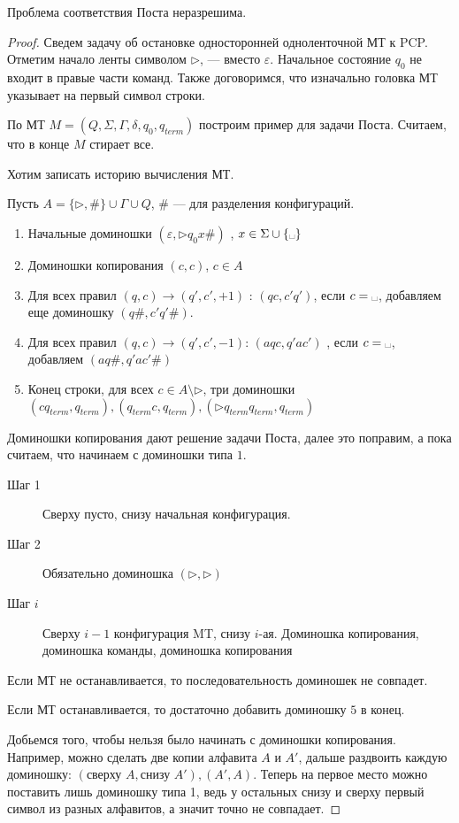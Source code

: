 \begin{thm}[Пост, 1946]
    Проблема соответствия Поста неразрешима.
\end{thm}
\begin{proof}
    Сведем задачу об остановке односторонней одноленточной МТ к PCP. Отметим начало ленты символом $ \triangleright$, \textvisiblespace --- вместо  $ \varepsilon $. Начальное состояние $  q_0$ не входит в правые части команд. Также договоримся, что изначально головка МТ указывает на первый символ строки.

	По МТ $ M = (Q, \Sigma, \Gamma, \delta , q_0, q_{term})$ построим пример для задачи Поста.
	Считаем, что в конце $ M$ стирает все.

	Хотим записать историю вычисления МТ.

	Пусть $ A = \{\triangleright, \#\} \cup \Gamma \cup  Q$, $ \#$ --- для разделения конфигураций.

	\begin{enumerate}
		\item Начальные доминошки $ ( \varepsilon , \triangleright q_0 x \#)$ , $ x \in \Sigma \cup \{\text{\textvisiblespace}\}$
		\item Доминошки копирования $ (c, c)$, $ c \in A $ 
		\item  Для всех правил $ (q, c) \to  (q', c', +1)$ : $(qc, c'q')$, если $ c = \text{\textvisiblespace}$, добавляем еще доминошку $ (q\# , c'q'\#)$.
		\item Для всех правил $ (q, c) \to  (q', c', -1)$: $ (aqc, q'ac')$ , если $ c = \text{\textvisiblespace}$, добавляем $ (aq\#, q'ac'\#)$ 
		\item Конец строки, для всех $ c \in A \setminus \triangleright$, три доминошки
			$ (cq_{term}, q_{term}), (q_{term}c, q_{term}), (\triangleright q_{term}q_{term}, q_{term})$
	\end{enumerate} 
	\begin{note}
	    Доминошки копирования дают решение задачи Поста, далее это поправим, а пока считаем, что начинаем с доминошки типа $ 1$.
	\end{note}
	\begin{description}
		\item[Шаг 1] Сверху пусто, снизу начальная конфигурация.
		\item[Шаг 2] Обязательно доминошка $ (\triangleright, \triangleright)$ 
		\item[Шаг $ i$] Сверху $ i-1$ конфигурация MT, снизу  $ i$-ая.
			Доминошка копирования, доминошка команды, доминошка копирования
	\end{description}
	Если МТ не останавливается, то последовательность доминошек не совпадет.

	Если МТ останавливается, то достаточно добавить доминошку  $ 5$ в конец.

	Добьемся того, чтобы нельзя было начинать с доминошки копирования. 
	Например, можно сделать две копии алфавита $ A$ и $ A'$,
	дальше раздвоить каждую доминошку: $ (\text{сверху }A, \text{снизу }A'), (A', A)$.
	Теперь на первое место можно поставить лишь доминошку типа 1, 
	ведь у остальных снизу и сверху первый символ из разных алфавитов, а значит точно не совпадает.
\end{proof}


